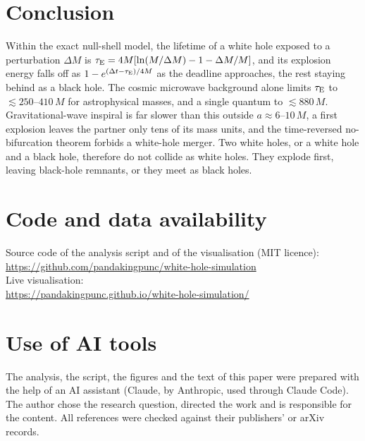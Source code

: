 \documentclass[11pt,a4paper]{article}
\newcommand{\dM}{\Delta M}
\newcommand{\tauE}{\tau_{\rm E}}
\begin{document}
\section{Conclusion}

Within the exact null-shell model, the lifetime of a white hole exposed to a perturbation $\dM$ is $\tauE = 4M[\ln(M/\dM)-1-\dM/M]$, and its explosion energy falls off as $1-e^{(\Delta t-\tauE)/4M}$ as the deadline approaches, the rest staying behind as a black hole. The cosmic microwave background alone limits $\tauE$ to $\lesssim 250$--$410\,M$ for astrophysical masses, and a single quantum to $\lesssim 880\,M$. Gravitational-wave inspiral is far slower than this outside $a\approx6$--$10\,M$, a first explosion leaves the partner only tens of its mass units, and the time-reversed no-bifurcation theorem forbids a white-hole merger. Two white holes, or a white hole and a black hole, therefore do not collide as white holes. They explode first, leaving black-hole remnants, or they meet as black holes.

\section*{Code and data availability}
Source code of the analysis script and of the visualisation (MIT licence):\\
\url{https://github.com/pandakingpunc/white-hole-simulation}\\
Live visualisation:\\
\url{https://pandakingpunc.github.io/white-hole-simulation/}

\section*{Use of AI tools}
The analysis, the script, the figures and the text of this paper were prepared with the help of an AI assistant (Claude, by Anthropic, used through Claude Code). The author chose the research question, directed the work and is responsible for the content. All references were checked against their publishers' or arXiv records.
\end{document}
